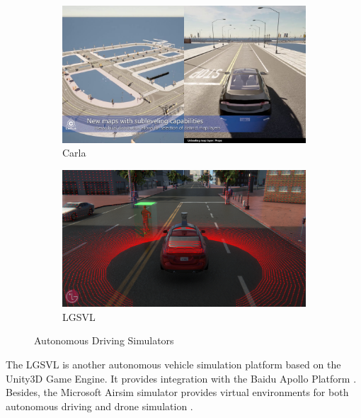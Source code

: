 \begin{figure}[H]
\centering
\begin{subfigure}[b]{0.48\textwidth}
    \centering
    \includegraphics[width=\textwidth]{figures/chapter_intro/carla.jpg}
    \caption{Carla}
    \label{fig:carla_intro}
\end{subfigure}
\hfill
\begin{subfigure}[b]{0.48\textwidth}
    \centering
    \includegraphics[width=\textwidth]{figures/chapter_intro/lgsvl.png}
    \caption{LGSVL}
    \label{fig:lvsvl}
\end{subfigure}
\hfill
\caption{Autonomous Driving Simulators}
\label{fig.simulator}
\end{figure}

The LGSVL is another autonomous vehicle simulation platform based on the Unity3D Game Engine. It provides integration with the Baidu Apollo Platform \citep{rong2020lgsvl}. Besides, the Microsoft Airsim simulator provides virtual environments for both autonomous driving and drone simulation \citep{airsim2017fsr}.

